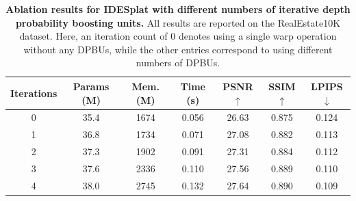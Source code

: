 \begin{table}
    \footnotesize
    \centering
    \caption{\textbf{Ablation results for IDESplat with different numbers of iterative depth probability boosting units.}  All results are reported on the RealEstate10K dataset. Here, an iteration count of 0 denotes using a single warp operation without any DPBUs, while the other entries correspond to using different numbers of DPBUs.}
    \vspace{-2mm}
    \setlength{\tabcolsep}{2.2pt} %
    \begin{tabular}{c|ccc|ccc}
        \toprule
        Iterations & Params (M) & Mem. (M) & Time (s) & PSNR$\uparrow$ & SSIM$\uparrow$ & LPIPS$\downarrow$ \\
        \midrule
        0           & 35.4 & 1674 & 0.056 & 26.63 & 0.875 & 0.124 \\
        1           & 36.8 & 1734 & 0.071 & 27.08 & 0.882 & 0.113\\
        2           & 37.3 & 1902 & 0.091 & 27.31 & 0.884 & 0.112\\
        3           & 37.6 & 2336 & 0.110 & 27.56 & 0.889 & 0.110\\
        4           & 38.0 & 2745 & 0.132 & 27.64 & 0.890 & 0.109\\
        \bottomrule
    \end{tabular}
        \label{tab:ablation_iterations}
        \vspace{-8mm}
\end{table}


